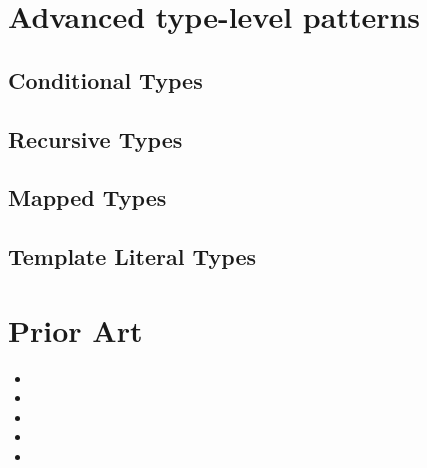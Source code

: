 \section{Advanced type-level patterns}

\subsection{Conditional Types}
\subsection{Recursive Types}
\subsection{Mapped Types}
\subsection{Template Literal Types}

\section{Prior Art}

\begin{itemize}
  \item {}
  \item {}
  \item {}
  \item {}
  \item {}
\end{itemize}